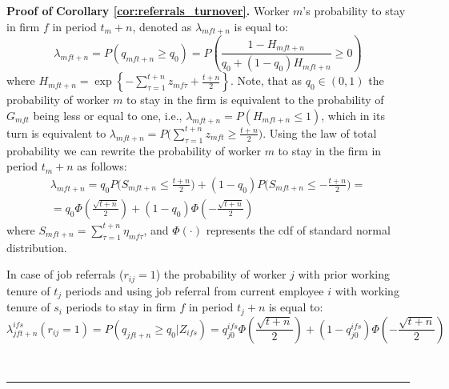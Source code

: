 \documentclass[12pt]{article}
\newenvironment{proof}[1][Proof of]{\noindent\textbf{#1} }{\ \rule{0.5em}{0.5em}}
\begin{document}
\begin{proof}
    \textbf{Corollary \ref{cor:referrals_turnover}.}
    Worker $m$'s probability to stay in firm $f$ in period $t_m+n$, denoted as $\lambda_{mft+n}$ is equal to:
    \begin{equation*}
             \lambda_{mft+n} 
             = 
             P\left( q_{mft+n} \geq q_0  \right)
             =
             P\left( \frac{1-H_{mft+n}}{q_0 + (1-q_0)H_{mft+n}} \geq 0  \right)
    \end{equation*}
    where $H_{mft+n} = \exp \left\lbrace -\sum_{\tau = 1}^{t+n} z_{mf\tau} +\frac{t+n}{2}\right\rbrace$. Note, that as $q_0 \in (0,1)$ the probability of worker $m$ to stay in the firm is equivalent to the probability of $G_{mft}$ being less or equal to one, i.e., $\lambda_{mft+n} = P(H_{mft+n}\leq 1)$, which in its turn is equivalent to $\lambda_{mft+n} = P\big(\sum_{\tau = 1}^{t+n}z_{mft}\geq \frac{t+n}{2}\big)$. Using the law of total probability we can rewrite the probability of worker $m$ to stay in the firm in period $t_m+n $ as follows:
    \begin{equation}
        \begin{aligned}
            \lambda_{mft+n} 
            = 
            q_0 P\bigg(S_{mft+n} \leq \frac{t+n}{2}\bigg) 
            + 
            (1-q_0)P\bigg(S_{mft+n} \leq -\frac{t+n}{2}\bigg)
            =\\
            =
            q_0\Phi\left(\frac{\sqrt{t+n}}{2}\right)
            +
            (1-q_0)\Phi\left(-\frac{\sqrt{t+n}}{2}\right)
        \end{aligned}
    \end{equation}
    where $S_{mft+n} = \sum_{\tau = 1}^{t+n}\eta_{mf\tau}$, and $\Phi(\cdot)$ represents the cdf of standard normal distribution.

    In case of job referrals ($r_{ij} = 1$) the probability of worker $j$ with prior working tenure of $t_j$ periods and using job referral from current employee $i$ with working tenure of $s_i$ periods to stay in firm $f$ in period $t_j+n$ is equal to:
    \begin{equation}
        \lambda_{jft+n}^{ifs}(r_{ij}=1) = P(q_{jft+n}\geq q_0 | Z_{ifs}) = q_{j0}^{ifs}\Phi\left(\frac{\sqrt{t+n}}{2}\right)
        +
        (1-q_{j0}^{ifs})\Phi\left(-\frac{\sqrt{t+n}}{2}\right)
    \end{equation}


\end{proof}
\end{document}
